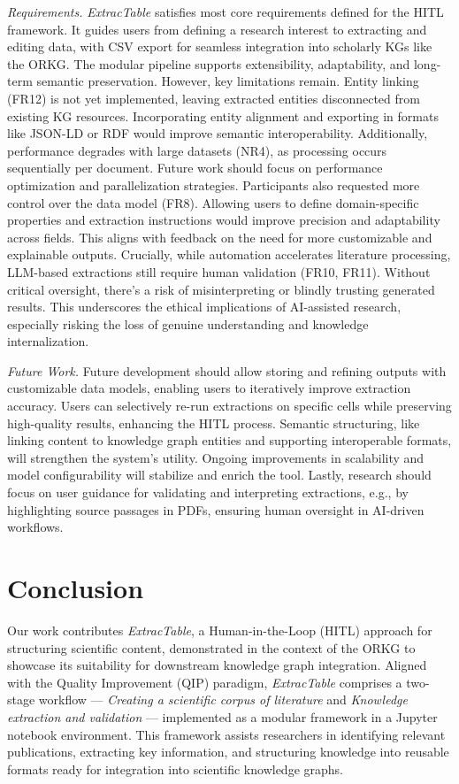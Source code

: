 \documentclass[runningheads]{llncs}
\begin{document}
\noindent
\textit{Requirements.} 
\textit{ExtracTable} satisfies most core requirements defined for the HITL framework. It guides users from defining a research interest to extracting and editing data, with CSV export for seamless integration into scholarly KGs like the ORKG. The modular pipeline supports extensibility, adaptability, and long-term semantic preservation.
However, key limitations remain. Entity linking (FR12) is not yet implemented, leaving extracted entities disconnected from existing KG resources. Incorporating entity alignment and exporting in formats like JSON-LD or RDF would improve semantic interoperability.
Additionally, performance degrades with large datasets (NR4), as processing occurs sequentially per document. Future work should focus on performance optimization and parallelization strategies.
Participants also requested more control over the data model (FR8). Allowing users to define domain-specific properties and extraction instructions would improve precision and adaptability across fields. This aligns with feedback on the need for more customizable and explainable outputs.
Crucially, while automation accelerates literature processing, LLM-based extractions still require human validation (FR10, FR11). Without critical oversight, there’s a risk of misinterpreting or blindly trusting generated results. This underscores the ethical implications of AI-assisted research, especially risking the loss of genuine understanding and knowledge internalization.\vspace{0.2cm}

\noindent
\textit{Future Work.}
Future development should allow storing and refining outputs with customizable data models, enabling users to iteratively improve extraction accuracy. Users can selectively re-run extractions on specific cells while preserving high-quality results, enhancing the HITL process. Semantic structuring, like linking content to knowledge graph entities and supporting interoperable formats, will strengthen the system’s utility. Ongoing improvements in scalability and model configurability will stabilize and enrich the tool. Lastly, research should focus on user guidance for validating and interpreting extractions, e.g., by highlighting source passages in PDFs, ensuring human oversight in AI-driven workflows.

\section{Conclusion\label{sec:conclusion}}
Our work contributes \textit{ExtracTable}, a Human-in-the-Loop (HITL) approach for structuring scientific content, demonstrated in the context of the ORKG to showcase its suitability for downstream knowledge graph integration. Aligned with the Quality Improvement (QIP) paradigm, \textit{ExtracTable} comprises a two-stage workflow — \textit{Creating a scientific corpus of literature} and \textit{Knowledge extraction and validation} — implemented as a modular framework in a Jupyter notebook environment. This framework assists researchers in identifying relevant publications, extracting key information, and structuring knowledge into reusable formats ready for integration into scientific knowledge graphs.
\end{document}
